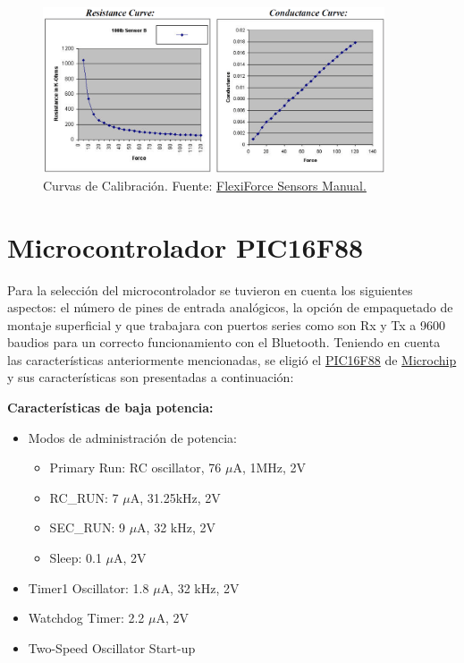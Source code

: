 \begin{figure}[H]
\centering
\includegraphics[width=0.9\textwidth]{./image/Curve.png}
\caption{Curvas de Calibración. Fuente: {\href{https://smartxpwiki.ewi.utwente.nl/_media/flx-flexiforce-sensors-manual.pdf}{FlexiForce Sensors Manual.}}}
\label{fig:Curvas}
\end{figure}

\section{Microcontrolador PIC16F88}
Para la selección del microcontrolador se tuvieron en cuenta los siguientes aspectos: el número de pines de entrada analógicos, la opción de empaquetado de montaje superficial y que trabajara con puertos series como son Rx y Tx a 9600 baudios para un correcto funcionamiento con el Bluetooth. Teniendo en cuenta las características anteriormente mencionadas, se eligió el \href{http://ww1.microchip.com/downloads/en/DeviceDoc/30487c.pdf}{PIC16F88} de \href{http://www.microchip.com/}{Microchip} y sus características son presentadas a continuación:

\textbf{Características de baja potencia:}
\begin{itemize}
\item Modos de administración de potencia:
	\begin{itemize}
	\item Primary Run: RC oscillator, 76 $\mu$A, 1MHz, 2V
    \item RC\_RUN: 7 $\mu$A, 31.25kHz, 2V
    \item SEC\_RUN: 9 $\mu$A, 32 kHz, 2V
    \item Sleep: 0.1 $\mu$A, 2V
	\end{itemize}
\item Timer1 Oscillator: 1.8 $\mu$A, 32 kHz, 2V
\item Watchdog Timer: 2.2 $\mu$A, 2V
\item Two-Speed Oscillator Start-up
\end{itemize}

